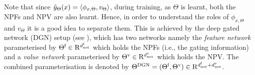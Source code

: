 Note that since $\hat{y}_{\Theta}(x)=\langle \phi_{x,\Theta},v_{\Theta}\rangle$, during training, as $\Theta$ is learnt, both the NPFs and NPV are also learnt. Hence, in order to understand the roles of $\phi_{x,\Theta}$ and $v_{\Theta}$ it is a good idea to separate them. This is achieved by the deep gated network (DGN) setup (see ), which has two networks namely the \emph{feature network} parameterised by $\Theta^{\textrm{f}}\in\mathrm{R}^{d^{\text{f}}_{\text{net}}}$ which holds the NPFs (i.e., the gating information) and a \emph{value network} parameterised by ${\Theta}^{\text{v}}\in\mathrm{R}^{d^{\text{v}}_{\text{net}}}$ which holds the NPV.  The combined parameterisation is denoted by $\Theta^{\text{DGN}}=(\Theta^{\textrm{f}},{\Theta}^{\text{v}})\in \mathrm{R}^{d^{\text{f}}_{\text{net}}+d^{\text{v}}_{\text{net}}}$.  


